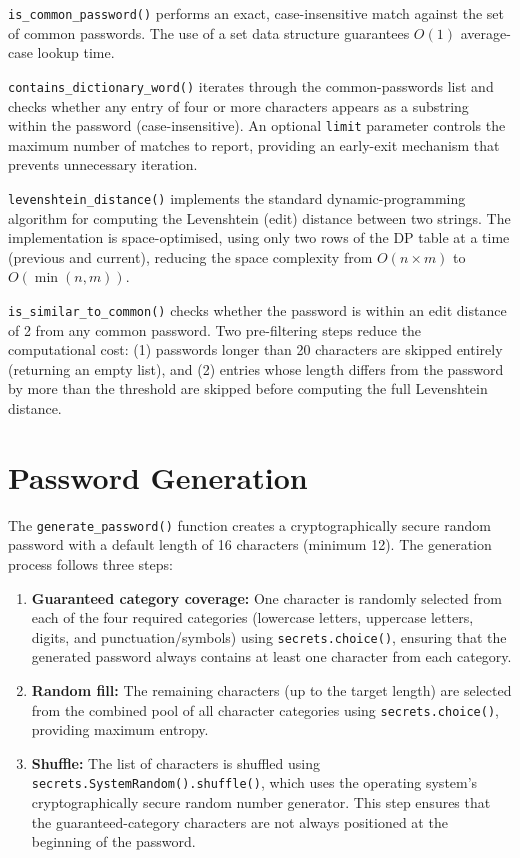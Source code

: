 \texttt{is\_common\_password()} performs an exact, case-insensitive match against the set of common passwords. The use of a set data structure guarantees $O(1)$ average-case lookup time.

\texttt{contains\_dictionary\_word()} iterates through the common-passwords list and checks whether any entry of four or more characters appears as a substring within the password (case-insensitive). An optional \texttt{limit} parameter controls the maximum number of matches to report, providing an early-exit mechanism that prevents unnecessary iteration.

\texttt{levenshtein\_distance()} implements the standard dynamic-programming algorithm for computing the Levenshtein (edit) distance between two strings. The implementation is space-optimised, using only two rows of the DP table at a time (previous and current), reducing the space complexity from $O(n \times m)$ to $O(\min(n, m))$.

\texttt{is\_similar\_to\_common()} checks whether the password is within an edit distance of 2 from any common password. Two pre-filtering steps reduce the computational cost: (1) passwords longer than 20 characters are skipped entirely (returning an empty list), and (2) entries whose length differs from the password by more than the threshold are skipped before computing the full Levenshtein distance.

\clearpage

\section{Password Generation}

The \texttt{generate\_password()} function creates a cryptographically secure random password with a default length of 16 characters (minimum 12). The generation process follows three steps:

\begin{enumerate}
    \item \textbf{Guaranteed category coverage:} One character is randomly selected from each of the four required categories (lowercase letters, uppercase letters, digits, and punctuation/symbols) using \texttt{secrets.choice()}, ensuring that the generated password always contains at least one character from each category.
    \item \textbf{Random fill:} The remaining characters (up to the target length) are selected from the combined pool of all character categories using \texttt{secrets.choice()}, providing maximum entropy.
    \item \textbf{Shuffle:} The list of characters is shuffled using \texttt{secrets.SystemRandom().shuffle()}, which uses the operating system's cryptographically secure random number generator. This step ensures that the guaranteed-category characters are not always positioned at the beginning of the password.
\end{enumerate}

